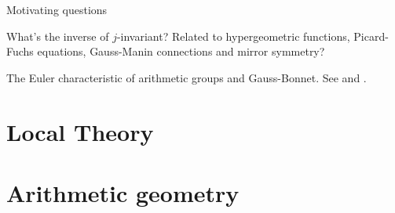\documentclass[article, a4paper, twoside]{universal}
\begin{document}
\confighead{}{}{}


\begin{qst}
	Motivating questions
	\begin{itm}
		\item What's the inverse of $j$-invariant? Related to hypergeometric functions, Picard-Fuchs equations, Gauss-Manin connections and mirror symmetry?
		\item The Euler characteristic of arithmetic groups and Gauss-Bonnet. See \cite[Page~255]{Brown1994} and \cite{Harder1971}.
	\end{itm}
\end{qst}


\part{Local Theory}





\part{Arithmetic geometry}















\printref
\end{document}
